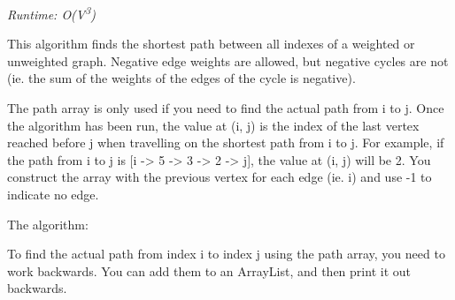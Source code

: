 
\textit{Runtime: O(V\textsuperscript{3})}

This algorithm finds the shortest path between all indexes of a weighted or unweighted graph. Negative edge weights are allowed, but negative cycles are not (ie. the sum of the weights of the edges of the cycle is negative).

The path array is only used if you need to find the actual path from i to j. Once the algorithm has been run, the value at (i, j) is the index of the last vertex reached before j when travelling on the shortest path from i to j. For example, if the path from i to j is [i -> 5 -> 3 -> 2 -> j], the value at (i, j) will be 2. You construct the array with the previous vertex for each edge (ie. i) and use -1 to indicate no edge.



The algorithm:



To find the actual path from index i to index j using the path array, you need to work backwards. You can add them to an ArrayList, and then print it out backwards.



\newpage